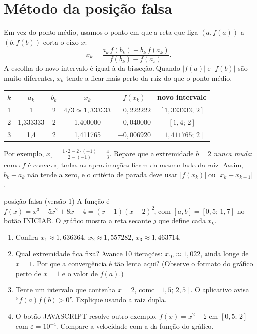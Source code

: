 \section{Método da posição falsa}

Em vez do ponto médio, usamos o ponto em que a reta que liga $(a,f(a))$ a $(b,f(b))$ corta o
eixo $x$:
\[
x_k=\frac{a_k\,f(b_k)-b_k\,f(a_k)}{f(b_k)-f(a_k)}.
\]
A escolha do novo intervalo é igual à da bisseção. Quando $|f(a)|$ e $|f(b)|$ são muito
diferentes, $x_k$ tende a ficar mais perto da raiz do que o ponto médio.

\begin{exemplo}[{: três iterações para $f(x)=x^2-2$ em $[1,2]$}]
\begin{center}
\begin{tabular}{cccccc}
\toprule
$k$ & $a_k$ & $b_k$ & $x_k$ & $f(x_k)$ & novo intervalo\\
\midrule
1 & 1 & 2 & $4/3\approx1{,}333333$ & $-0{,}222222$ & $[1{,}333333;\,2]$\\
2 & 1{,}333333 & 2 & 1{,}400000 & $-0{,}040000$ & $[1{,}4;\,2]$\\
3 & 1{,}4 & 2 & 1{,}411765 & $-0{,}006920$ & $[1{,}411765;\,2]$\\
\bottomrule
\end{tabular}
\end{center}
Por exemplo, $x_1=\frac{1\cdot2-2\cdot(-1)}{2-(-1)}=\frac43$. Repare que a extremidade $b=2$
\emph{nunca muda}: como $f$ é convexa, todas as aproximações ficam do mesmo lado da raiz. Assim,
$b_k-a_k$ não tende a zero, e o critério de parada deve usar $|f(x_k)|$ ou $|x_k-x_{k-1}|$.
\end{exemplo}

\begin{atividade}{posição falsa (versão 1)}{\arqPosA}
A função é $f(x)=x^3-5x^2+8x-4=(x-1)(x-2)^2$, com $[a,b]=[0{,}5;\,1{,}7]$ no botão INICIAR. O
gráfico mostra a reta secante $g$ que define cada $x_k$.
\begin{enumerate}[nosep]
  \item Confira $x_1\approx1{,}636364$, $x_2\approx1{,}557282$, $x_3\approx1{,}463714$.
  \item Qual extremidade fica fixa? Avance 10 iterações: $x_{10}\approx1{,}022$, ainda longe de
        $\bar x=1$. Por que a convergência é tão lenta aqui? (Observe o formato do gráfico perto de
        $x=1$ e o valor de $f(a)$.)
  \item Tente um intervalo que contenha $x=2$, como $[1{,}5;\,2{,}5]$. O aplicativo avisa
        ``$f(a)f(b)>0$''. Explique usando a raiz dupla.
  \item O botão JAVASCRIPT resolve outro exemplo, $f(x)=x^2-2$ em $[0{,}5;\,2]$ com $\varepsilon=10^{-4}$.
        Compare a velocidade com a da função do gráfico.
\end{enumerate}
\end{atividade}

